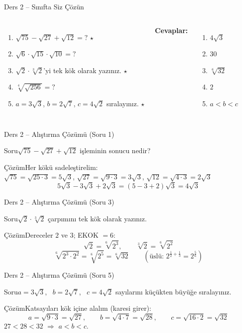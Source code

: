 \documentclass[aspectratio=169,11pt,handout]{beamer}
\newcommand{\soru}[3]{%
\begin{frame}{#1}
  \begin{block}{Soru}\large #2\end{block}
  \pause
  \begin{exampleblock}{Çözüm}\large #3\end{exampleblock}
\end{frame}}
\begin{document}
\begin{frame}{Ders 2 -- Sınıfta Siz Çözün}
\begin{columns}[t]
\begin{enumerate}
\item \(\sqrt{75}-\sqrt{27}+\sqrt{12}=?\) \(\star\)
\item \(\sqrt6\cdot\sqrt{15}\cdot\sqrt{10}=?\)
\item \(\sqrt2\cdot\sqrt[3]{2}\)'yi tek kök olarak yazınız. \(\star\)
\item \(\sqrt[4]{\sqrt{256}}=?\)
\item \(a=3\sqrt3\), \(b=2\sqrt7\), \(c=4\sqrt2\) sıralayınız. \(\star\)
\end{enumerate}
\pause
\textbf{Cevaplar:}
\begin{enumerate}
\item \(4\sqrt3\)
\item \(30\)
\item \(\sqrt[6]{32}\)
\item \(2\)
\item \(a<b<c\)
\end{enumerate}
\end{columns}
\vspace{4pt}{\footnotesize \(\star\) işaretli soruların adım adım çözümü sonraki slaytlardadır.}
\end{frame}

\soru{Ders 2 -- Alıştırma Çözümü (Soru 1)}
{\(\sqrt{75}-\sqrt{27}+\sqrt{12}\) işleminin sonucu nedir?}
{Her kökü sadeleştirelim:\\[3pt]
\(\sqrt{75}=\sqrt{25\cdot 3}=5\sqrt3\), \quad \(\sqrt{27}=\sqrt{9\cdot 3}=3\sqrt3\), \quad \(\sqrt{12}=\sqrt{4\cdot 3}=2\sqrt3\)
\[5\sqrt3-3\sqrt3+2\sqrt3=(5-3+2)\sqrt3=4\sqrt3\]}

\soru{Ders 2 -- Alıştırma Çözümü (Soru 3)}
{\(\sqrt2\cdot\sqrt[3]{2}\) çarpımını tek kök olarak yazınız.}
{Dereceler \(2\) ve \(3\); EKOK \(=6\):
\[\sqrt2=\sqrt[6]{2^3},\qquad \sqrt[3]{2}=\sqrt[6]{2^2}\]
\[\sqrt[6]{2^3\cdot 2^2}=\sqrt[6]{2^5}=\sqrt[6]{32}\qquad(\text{üslü: } 2^{\frac12+\frac13}=2^{\frac56})\]}

\soru{Ders 2 -- Alıştırma Çözümü (Soru 5)}
{\(a=3\sqrt3\), \ \(b=2\sqrt7\), \ \(c=4\sqrt2\) sayılarını küçükten büyüğe sıralayınız.}
{Katsayıları kök içine alalım (karesi girer):
\[a=\sqrt{9\cdot 3}=\sqrt{27},\qquad b=\sqrt{4\cdot 7}=\sqrt{28},\qquad c=\sqrt{16\cdot 2}=\sqrt{32}\]
\(27<28<32\) \(\Rightarrow\) \(a<b<c\).}
\end{document}
